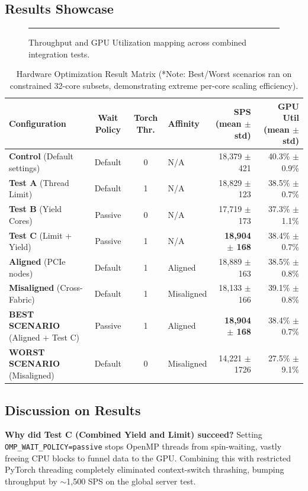 \documentclass[11pt,a4paper]{article}
\begin{document}
\subsection{Results Showcase}

\begin{figure}[htbp]
    \centering
    \rule{0.9\linewidth}{4cm} %
    \caption{Throughput and GPU Utilization mapping across combined integration tests.}
    \label{fig:phase2_throughput}
\end{figure}

\begin{table}[h]
\centering
\begin{tabular}{l c c l r r}
\toprule
\textbf{Configuration} & \textbf{Wait Policy} & \textbf{Torch Thr.} & \textbf{Affinity} & \textbf{SPS (mean $\pm$ std)} & \textbf{GPU Util (mean $\pm$ std)} \\
\midrule
\textbf{Control} (Default settings) & Default & 0 & N/A & 18,379 $\pm$ 421 & 40.3\% $\pm$ 0.9\% \\
\textbf{Test A} (Thread Limit) & Default & 1 & N/A & 18,829 $\pm$ 123 & 38.5\% $\pm$ 0.7\% \\
\textbf{Test B} (Yield Cores) & Passive & 0 & N/A & 17,719 $\pm$ 173 & 37.3\% $\pm$ 1.1\% \\
\textbf{Test C} (Limit + Yield) & Passive & 1 & N/A & \textbf{18,904 $\pm$ 168} & 38.4\% $\pm$ 0.7\% \\
\textbf{Aligned} (PCIe nodes) & Default & 1 & Aligned & 18,889 $\pm$ 163 & 38.5\% $\pm$ 0.8\% \\
\textbf{Misaligned} (Cross-Fabric) & Default & 1 & Misaligned & 18,133 $\pm$ 166 & 39.1\% $\pm$ 0.8\% \\
\textbf{BEST SCENARIO} (Aligned + Test C) & Passive & 1 & Aligned & \textbf{18,904 $\pm$ 168} & 38.4\% $\pm$ 0.7\% \\
\textbf{WORST SCENARIO} (Misaligned) & Default & 0 & Misaligned & 14,221 $\pm$ 1726 & 27.5\% $\pm$ 9.1\% \\
\bottomrule
\end{tabular}
\caption{Hardware Optimization Result Matrix (*Note: Best/Worst scenarios ran on constrained 32-core subsets, demonstrating extreme per-core scaling efficiency).}
\label{tab:results_matrix}
\end{table}

\subsection{Discussion on Results}
\textbf{Why did Test C (Combined Yield and Limit) succeed?} 
Setting \texttt{OMP\_WAIT\_POLICY=passive} stops OpenMP threads from spin-waiting, vastly freeing CPU blocks to funnel data to the GPU. Combining this with restricted PyTorch threading completely eliminated context-switch thrashing, bumping throughput by $\sim$1,500 SPS on the global server test.
\end{document}
